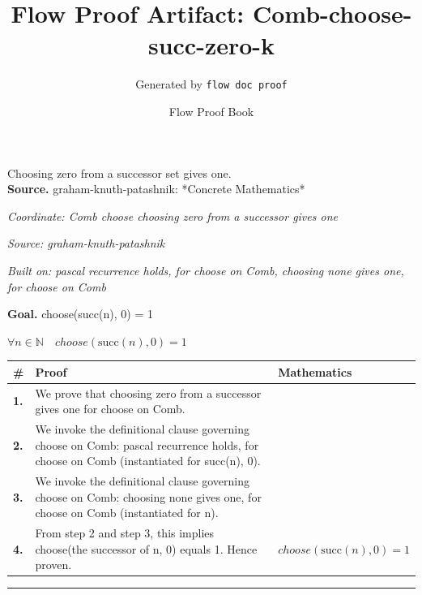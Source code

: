 \documentclass[11pt]{article}
\title{Flow Proof Artifact: Comb-choose-succ-zero-k}
\author{Generated by \texttt{flow doc proof}}
\date{Flow Proof Book}
\theoremstyle{definition}
\begin{document}
\maketitle
Choosing zero from a successor set gives one.\\[0.5em]
\textbf{Source.} graham-knuth-patashnik: *Concrete Mathematics*\\[0.5em]
\bigskip
{}\par
\smallskip\noindent\textit{Coordinate: Comb \cdot choose \cdot choosing zero from a successor gives one}\par
\smallskip\noindent\textit{Source: graham-knuth-patashnik}\par
\smallskip\noindent\textit{Built on: pascal recurrence holds, for choose on Comb, choosing none gives one, for choose on Comb}\par
\medskip
\noindent\textbf{Goal.} choose(succ(n), 0) = 1\par
\noindent$\displaystyle \forall n \in \mathbb{N}\quad choose(\mathrm{succ}(n), 0) = 1$\par
\medskip
\noindent
\begin{tabular}{@{} >{\raggedright\arraybackslash}p{} >{\raggedright\arraybackslash}p{} >{\raggedleft\arraybackslash}p{} @{}}
\textbf{\#} & \textbf{Proof} & \textbf{Mathematics} \\
\midrule
\textbf{1.} & We prove that choosing zero from a successor gives one for choose on Comb. & \\[0.45em]
\textbf{2.} & We invoke the definitional clause governing choose on Comb: pascal recurrence holds, for choose on Comb (instantiated for succ(n), 0). & \\[0.45em]
\textbf{3.} & We invoke the definitional clause governing choose on Comb: choosing none gives one, for choose on Comb (instantiated for n). & \\[0.45em]
\textbf{4.} & From step 2 and step 3, this implies choose(the successor of n, 0) equals 1. Hence proven. & $\displaystyle choose(\mathrm{succ}(n), 0) = 1$ \\[0.45em]
\bottomrule
\end{tabular}
\label{thm:Comb-choose-choosing_zero_from_a_successor_gives_one}
\par\medskip\hrule
\end{document}
